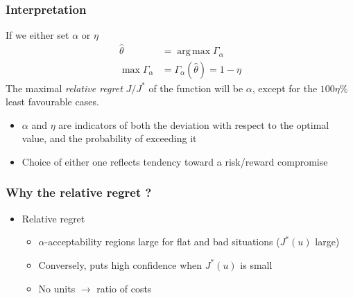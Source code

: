 \documentclass[11pt]{beamer}
\DeclareMathOperator*{\argmax}{arg\,max}
\newcommand{\kk}{\theta}
\newcommand{\uu}{u}
\newcommand\manupath{/home/victor/acadwriting/Manuscrit/Text/}
\begin{document}
\begin{frame}
  \frametitle{Interpretation}
If we either set $\alpha$ or $\eta$
  \begin{align}
    \hat{\kk} &= \argmax \Gamma_{\alpha} \\
    \max \Gamma_{\alpha} &= \Gamma_{\alpha}(\hat{\kk}) = 1-\eta
    \end{align}
    The maximal \emph{relative regret} $J / J^*$ of the function will be $\alpha$, except for the $100\eta\%$ least favourable cases.
    \begin{itemize}
    \item $\alpha$ and $\eta$ are indicators of both the deviation with respect to the optimal value, and the probability of exceeding it
    \item Choice of either one reflects tendency toward a risk/reward compromise
    \end{itemize}
\end{frame}
\begin{frame}
  \frametitle{Why the relative regret ?}

  
  \renewcommand\rmfamily{\sffamily}
  \begin{center}
  \resizebox{.6\textwidth}{!}{}
\end{center}
  \begin{itemize}
  \item Relative regret
    \begin{itemize}
    \item $\alpha$-acceptability regions large for flat and bad situations ($J^*(\uu)$ large)
    \item Conversely, puts high confidence when $J^*(\uu)$ is small
    \item No units $\rightarrow$ ratio of costs
    \end{itemize}
  \end{itemize}
\end{frame}
\end{document}
